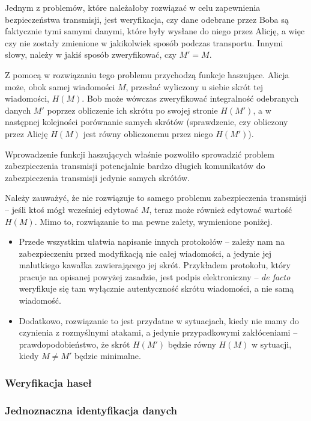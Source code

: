 \documentclass[12pt,a4paper,twoside]{article}
\begin{document}

Jednym z problemów, które należałoby rozwiązać w celu zapewnienia
bezpieczeństwa transmisji, jest weryfikacja, czy dane odebrane przez Boba są
faktycznie tymi samymi danymi, które były wysłane do niego przez Alicję, a więc
czy nie zostały zmienione w jakikolwiek sposób podczas transportu. Innymi
słowy, należy w jakiś sposób zweryfikować, czy $M' = M$.

Z pomocą w rozwiązaniu tego problemu przychodzą funkcje haszujące. Alicja może,
obok samej wiadomości $M$, przesłać wyliczony u siebie skrót tej wiadomości,
$H(M)$.  Bob może wówczas zweryfikować integralność odebranych danych $M'$
poprzez obliczenie ich skrótu po swojej stronie $H(M')$, a w następnej
kolejności porównanie samych skrótów (sprawdzenie, czy obliczony przez Alicję
$H(M)$ jest równy obliczonemu przez niego $H(M')$).

Wprowadzenie funkcji haszujących właśnie pozwoliło sprowadzić problem
zabezpieczenia transmisji potencjalnie bardzo długich komunikatów do
zabezpieczenia transmisji jedynie samych skrótów.

Należy zauważyć, że nie rozwiązuje to samego problemu zabezpieczenia transmisji
-- jeśli ktoś mógł wcześniej edytować $M$, teraz może również edytować wartość
$H(M)$. Mimo to, rozwiązanie to ma pewne zalety, wymienione poniżej.

\begin{itemize}
\item Przede wszystkim ułatwia napisanie innych protokołów -- zależy nam na
zabezpieczeniu przed modyfikacją nie całej wiadomości, a jedynie jej malutkiego
kawałka zawierającego jej skrót. Przykładem protokołu, który pracuje na
opisanej powyżej zasadzie, jest podpis elektroniczny -- \emph{de facto}
weryfikuje się tam wyłącznie autentyczność skrótu wiadomości, a nie samą
wiadomość.
\item Dodatkowo, rozwiązanie to jest przydatne w sytuacjach, kiedy nie mamy do
czynienia z rozmyślnymi atakami, a jedynie przypadkowymi zakłóceniami --
prawdopodobieństwo, że skrót $H(M')$ będzie równy $H(M)$ w sytuacji, kiedy $M
\neq M'$ będzie minimalne.
\end{itemize}

\subsubsection{Weryfikacja haseł}

\subsubsection{Jednoznaczna identyfikacja danych}
\end{document}

